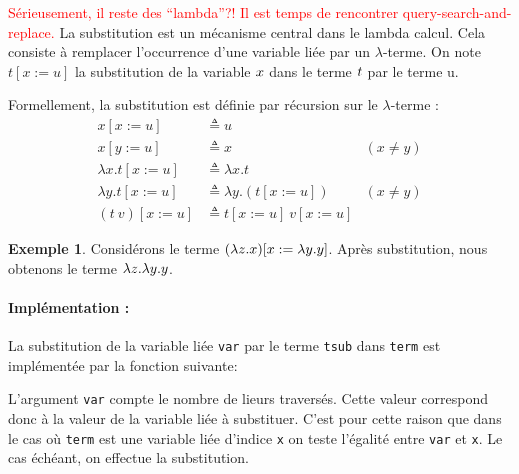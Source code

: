\documentclass {article}
\newcommand{\codefrom}[3]
           {}
\theoremstyle{definition}
\newtheorem{example}{Exemple}
\theoremstyle{remark}
\newcommand{\todo}[1]{\textcolor{red}{#1}}
\newcommand{\fun}[1]{\lstinline!#1!}
\begin{document}
\newcommand{\subst}[3]{#1[#2 := #3]}

\todo{Sérieusement, il reste des ``lambda''?! Il est temps de rencontrer query-search-and-replace.}
La substitution est un mécanisme central dans le lambda calcul. Cela consiste 
à remplacer l'occurrence d'une variable liée par un \(\lambda\)-terme.
On note \(\subst{t}{x}{u}\) la substitution de la variable $x$ dans le terme $t$ par le 
terme u.

Formellement, la substitution est définie par récursion sur le $\lambda$-terme : 
\begin{align*}
    \subst{x}{x}{u} &\triangleq u \\
    \subst{x}{y}{u} &\triangleq x & (x \neq y)\\
    \subst{\lambda x.t}{x}{u} &\triangleq \lambda x.t \\
    \subst{\lambda y.t}{x}{u} &\triangleq \lambda y. (\subst{t}{x}{u}) & (x \neq y)\\
    \subst{(t\: v)}{x}{u} &\triangleq \subst{t}{x}{u}\: \subst{v}{x}{u}
\end{align*}

\begin{example}
  Considérons le terme $\subst{(\Lam{z}{x})}{x}{\Lam{y}{y}}$. Après substitution, nous obtenons le terme $\lambda z. \lambda y. y$.
\end{example}


\paragraph{Implémentation :} 
La substitution de la variable liée \lstinline!var! par le terme
\lstinline!tsub! dans \lstinline!term! est implémentée par la fonction suivante:
%
\codefrom{untyped}{lambda}{substitution}

L'argument \fun{var} compte le nombre de lieurs traversés.
Cette valeur correspond donc à la valeur de la variable liée à substituer. C'est pour cette
raison que dans le cas où \fun{term} est une variable liée d'indice \fun{x} on teste l'égalité entre 
\fun{var} et \fun{x}. Le cas échéant, on effectue la substitution.
\end{document}
